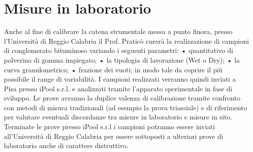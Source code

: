 \documentclass[12pt,a4paper]{article}
\begin{document}
 \section{Misure in laboratorio}
 Anche al fine di calibrare la catena strumentale messa a punto finora, presso l’Università di Reggio Calabria il Prof. Praticò curerà la realizzazione di campioni di conglomerato bituminoso variando i seguenti parametri:
    • quantitativo di polverino di gomma impiegato;
    • la tipologia di lavorazione (Wet o Dry);
    • la curva granulometrica;
    • frazione dei vuoti;
in modo tale da coprire il più possibile il range di variabilità.
I campioni realizzati verranno quindi inviati a Pisa presso iPool s.r.l. e analizzati tramite l’apparato sperimentale in fase di sviluppo. Le prove avranno la duplice valenza di calibrazione tramite confronto con metodi di misura tradizionali (ad esempio la prova triassiale) e di riferimento per valutare eventuali discordanze tra misure in laboratorio e misure in sito. Terminate le prove presso iPool s.r.l i campioni potranno essere inviati all’Università  di Reggio Calabria per essere sottoposti a ulteriori prove di laboratorio anche di carattere distruttivo.

 
\end{document}
